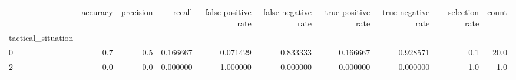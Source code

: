 \begin{tabular}{lrrrrrrrrr}
\toprule
{} &  accuracy &  precision &    recall &  false positive rate &  false negative rate &  true positive rate &  true negative rate &  selection rate &  count \\
tactical\_situation &           &            &           &                      &                      &                     &                     &                 &        \\
\midrule
0                  &       0.7 &        0.5 &  0.166667 &             0.071429 &             0.833333 &            0.166667 &            0.928571 &             0.1 &   20.0 \\
2                  &       0.0 &        0.0 &  0.000000 &             1.000000 &             0.000000 &            0.000000 &            0.000000 &             1.0 &    1.0 \\
\bottomrule
\end{tabular}
